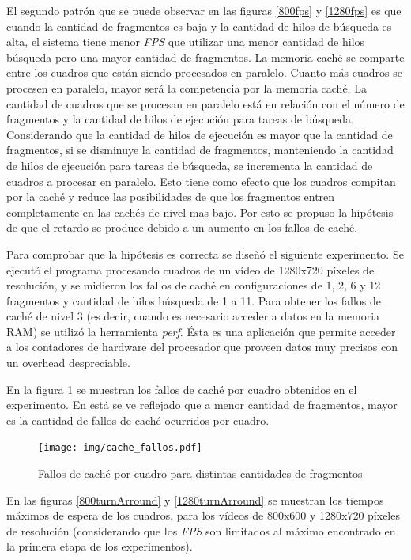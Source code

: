 El segundo patrón que se puede observar en las figuras \ref{800fps} y
\ref{1280fps} es que cuando la cantidad de fragmentos es baja y la cantidad de
hilos de búsqueda es alta, el sistema tiene menor \emph{FPS} que utilizar una
menor cantidad de hilos búsqueda pero una mayor cantidad de fragmentos. La
memoria caché se comparte entre los cuadros que están siendo procesados en
paralelo. Cuanto más cuadros se procesen en paralelo, mayor será la competencia
por la memoria caché. La cantidad de cuadros que se procesan en paralelo está en
relación con el número de fragmentos y la cantidad de hilos de ejecución para
tareas de búsqueda. Considerando que la cantidad de hilos de ejecución es mayor
que la cantidad de fragmentos, si se disminuye la cantidad de fragmentos,
manteniendo la cantidad de hilos de ejecución para tareas de búsqueda, se
incrementa la cantidad de cuadros a procesar en paralelo. Esto tiene como efecto
que los cuadros compitan por la caché y reduce las posibilidades de que los
fragmentos entren completamente en las cachés de nivel mas bajo. Por esto se
propuso la hipótesis de que el retardo se produce debido a un aumento en los
fallos de caché.

Para comprobar que la hipótesis es correcta se diseñó el siguiente experimento.
Se ejecutó el programa procesando cuadros de un vídeo de 1280x720 píxeles de
resolución, y se midieron los fallos de caché en configuraciones de 1, 2, 6 y 12
fragmentos y cantidad de hilos búsqueda de 1 a 11. Para obtener los fallos de
caché de nivel 3 (es decir, cuando es necesario acceder a datos en la memoria
RAM) se utilizó la herramienta \emph{perf}. Ésta es una aplicación que permite
acceder a los contadores de hardware del procesador que proveen datos muy
precisos con un overhead despreciable.

En la figura \ref{cacheFallos} se muestran los fallos de caché por cuadro
obtenidos en el experimento. En está se ve reflejado que a menor cantidad de
fragmentos, mayor es la cantidad de fallos de caché ocurridos por cuadro.

\begin{figure}[!h]

	\texttt{[image: img/cache\_fallos.pdf]}
	\caption{Fallos de caché por cuadro para distintas cantidades de
	fragmentos}
	\label{cacheFallos}

\end{figure}

En las figuras \ref{800turnArround} y \ref{1280turnArround} se muestran los
tiempos máximos de espera de los cuadros, para los vídeos de 800x600 y 1280x720
píxeles de resolución (considerando que los \emph{FPS} son limitados al máximo
encontrado en la primera etapa de los experimentos).

